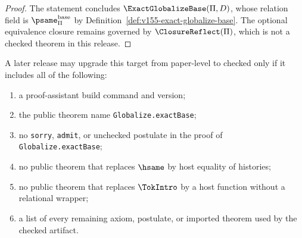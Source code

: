 \begin{proof}
The statement concludes \(\ExactGlobalizeBase(\Pi,D)\), whose relation field is \(\psame_{\Pi}^{\mathrm{base}}\) by Definition~\ref{def:v155-exact-globalize-base}. The optional equivalence closure remains governed by \(\ClosureReflect(\Pi)\), which is not a checked theorem in this release.
\end{proof}

\begin{protocol}
\label{prot:v155-checked-acceptance-gate}
A later release may upgrade this target from paper-level to checked only if it includes all of the following:
\begin{enumerate}
  \item a proof-assistant build command and version;
  \item the public theorem name \texttt{Globalize.exactBase};
  \item no \texttt{sorry}, \texttt{admit}, or unchecked postulate in the proof of \texttt{Globalize.exactBase};
  \item no public theorem that replaces \(\hsame\) by host equality of histories;
  \item no public theorem that replaces \(\TokIntro\) by a host function without a relational wrapper;
  \item a list of every remaining axiom, postulate, or imported theorem used by the checked artifact.
\end{enumerate}
\end{protocol}
